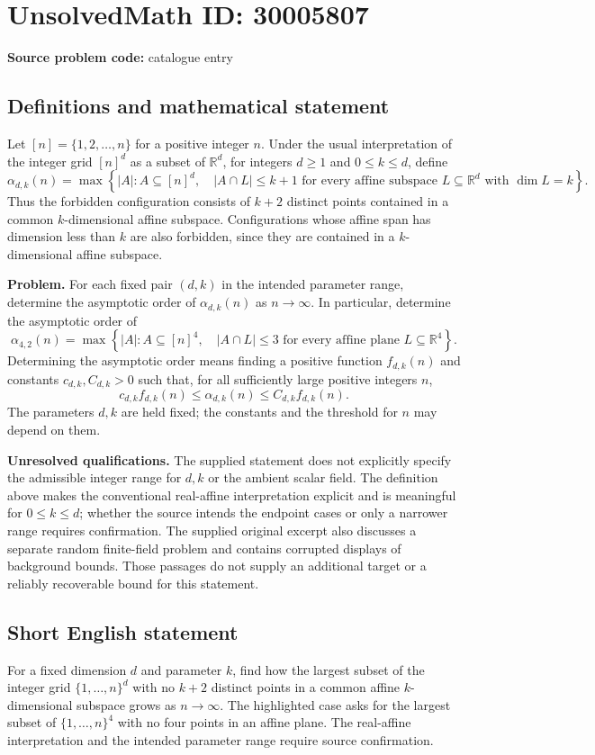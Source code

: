 \documentclass[11pt]{article}
\newcommand{\R}{\mathbb{R}}
\begin{document}
\section*{UnsolvedMath ID: 30005807}
\textbf{Source problem code:} catalogue entry
\subsection{Definitions and mathematical statement}
Let \([n]=\{1,2,\ldots,n\}\) for a positive integer \(n\). Under the usual interpretation of the integer grid \([n]^d\) as a subset of \(\R^d\), for integers \(d\geq 1\) and \(0\leq k\leq d\), define
\[
\alpha_{d,k}(n)=\max\left\{|A|: A\subseteq[n]^d,\quad |A\cap L|\leq k+1\text{ for every affine subspace }L\subseteq\R^d\text{ with }\dim L=k\right\}.
\]
Thus the forbidden configuration consists of \(k+2\) distinct points contained in a common \(k\)-dimensional affine subspace. Configurations whose affine span has dimension less than \(k\) are also forbidden, since they are contained in a \(k\)-dimensional affine subspace.

\textbf{Problem.} For each fixed pair \((d,k)\) in the intended parameter range, determine the asymptotic order of \(\alpha_{d,k}(n)\) as \(n\to\infty\). In particular, determine the asymptotic order of
\[
\alpha_{4,2}(n)=\max\left\{|A|:A\subseteq[n]^4,\quad |A\cap L|\leq 3\text{ for every affine plane }L\subseteq\R^4\right\}.
\]
Determining the asymptotic order means finding a positive function \(f_{d,k}(n)\) and constants \(c_{d,k},C_{d,k}>0\) such that, for all sufficiently large positive integers \(n\),
\[
c_{d,k}f_{d,k}(n)\leq\alpha_{d,k}(n)\leq C_{d,k}f_{d,k}(n).
\]
The parameters \(d,k\) are held fixed; the constants and the threshold for \(n\) may depend on them.

\textbf{Unresolved qualifications.} The supplied statement does not explicitly specify the admissible integer range for \(d,k\) or the ambient scalar field. The definition above makes the conventional real-affine interpretation explicit and is meaningful for \(0\leq k\leq d\); whether the source intends the endpoint cases or only a narrower range requires confirmation. The supplied original excerpt also discusses a separate random finite-field problem and contains corrupted displays of background bounds. Those passages do not supply an additional target or a reliably recoverable bound for this statement.
\subsection{Short English statement}
For a fixed dimension \(d\) and parameter \(k\), find how the largest subset of the integer grid \(\{1,\ldots,n\}^d\) with no \(k+2\) distinct points in a common affine \(k\)-dimensional subspace grows as \(n\to\infty\). The highlighted case asks for the largest subset of \(\{1,\ldots,n\}^4\) with no four points in an affine plane. The real-affine interpretation and the intended parameter range require source confirmation.
\end{document}
